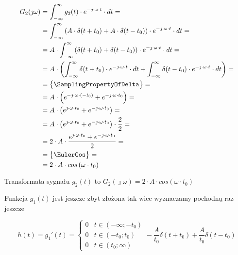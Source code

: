 \begin{task}
\begin{align*}
G_2(\jmath \omega )&=\int_{-\infty }^{\infty}g_2(t) \cdot e^{-\jmath \cdot \omega \cdot t}\cdot dt=\\
&=\int_{-\infty }^{\infty}\left( A \cdot \delta(t+t_0) + A \cdot \delta(t-t_0)\right) \cdot e^{-\jmath \cdot \omega \cdot t}\cdot dt=\\
&=A \cdot \int_{-\infty }^{\infty} \left( \delta(t+t_0) + \delta(t-t_0) \right) \cdot e^{-\jmath \cdot \omega \cdot t}\cdot dt=\\
&=A \cdot \left( \int_{-\infty }^{\infty} \delta(t+t_0) \cdot e^{-\jmath \cdot \omega \cdot t}\cdot dt + \int_{-\infty }^{\infty} \delta(t-t_0) \cdot e^{-\jmath \cdot \omega \cdot t}\cdot dt \right)=\\
&=\begin{Bmatrix}
\SamplingPropertyOfDelta
\end{Bmatrix}=\\
&= A \cdot \left( e^{-\jmath \cdot \omega \cdot (-t_0)} + e^{-\jmath \cdot \omega \cdot t_0} \right)=\\
&= A \cdot \left( e^{\jmath \cdot \omega \cdot t_0} + e^{-\jmath \cdot \omega \cdot t_0} \right)=\\
&= A \cdot \left( e^{\jmath \cdot \omega \cdot t_0} + e^{-\jmath \cdot \omega \cdot t_0} \right) \cdot \frac{2}{2}=\\
&= 2 \cdot A \cdot \frac{ e^{\jmath \cdot \omega \cdot t_0} + e^{-\jmath \cdot \omega \cdot t_0} }{2} =\\
&=\begin{Bmatrix}
\EulerCos
\end{Bmatrix}=\\
&= 2 \cdot A \cdot cos\left( \omega \cdot t_0\right) 
\end{align*}

Transformata sygnału $g_2(t)$ to $G_2(\jmath \omega)=2 \cdot A \cdot cos\left( \omega \cdot t_0\right)$

Funkcja $g_1(t)$ jest jeszcze zbyt złożona tak wiec wyznaczamy pochodną raz jeszcze 

\begin{equation}
h(t)=g_1'(t)=\begin{cases}
0 & t \in \left( -\infty; -t_0 \right ) \\
0 & t \in \left( -t_0; t_0 \right ) \\
0 & t \in \left( t_0; \infty \right )
\end{cases} - \frac{A}{t_0} \delta(t+t_0) + \frac{A}{t_0} \delta(t-t_0)
\end{equation}


\end{task}

